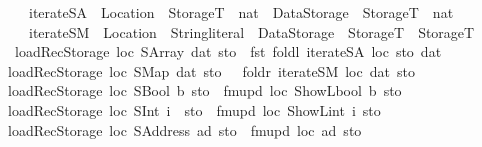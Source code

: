 \begin{isabellebody}
\ \ \ \ iterateSA\ {\isacharcolon}{\kern0pt}{\isacharcolon}{\kern0pt}\ {\isachardoublequoteopen}Location\ {\isasymRightarrow}\ StorageT\ {\isasymtimes}\ nat\ {\isasymRightarrow}\ Data\isactrlsub S\isactrlsub t\isactrlsub o\isactrlsub r\isactrlsub a\isactrlsub g\isactrlsub e\ {\isasymRightarrow}\ StorageT\ {\isasymtimes}\ nat{\isachardoublequoteclose}\ \isanewline
\ \ \ \ iterateSM\ {\isacharcolon}{\kern0pt}{\isacharcolon}{\kern0pt}\ {\isachardoublequoteopen}Location\ {\isasymRightarrow}\ String{\isachardot}{\kern0pt}literal\ {\isasymtimes}\ Data\isactrlsub S\isactrlsub t\isactrlsub o\isactrlsub r\isactrlsub a\isactrlsub g\isactrlsub e\ {\isasymRightarrow}\ StorageT\ {\isasymRightarrow}\ StorageT{\isachardoublequoteclose}\ \isanewline
\ \ {\isachardoublequoteopen}loadRec\isactrlsub S\isactrlsub t\isactrlsub o\isactrlsub r\isactrlsub a\isactrlsub g\isactrlsub e\ loc\ {\isacharparenleft}{\kern0pt}SArray\ dat{\isacharparenright}{\kern0pt}\ sto\ {\isacharequal}{\kern0pt}\ fst\ {\isacharparenleft}{\kern0pt}foldl\ {\isacharparenleft}{\kern0pt}iterateSA\ loc{\isacharparenright}{\kern0pt}\ {\isacharparenleft}{\kern0pt}sto{\isacharcomma}{\kern0pt}{}{\isacharparenright}{\kern0pt}\ dat{\isacharparenright}{\kern0pt}{\isachardoublequoteclose}\isanewline
{\isacharbar}{\kern0pt}\ {\isachardoublequoteopen}loadRec\isactrlsub S\isactrlsub t\isactrlsub o\isactrlsub r\isactrlsub a\isactrlsub g\isactrlsub e\ loc\ {\isacharparenleft}{\kern0pt}SMap\ dat{\isacharparenright}{\kern0pt}\ sto\ \ {\isacharequal}{\kern0pt}\ foldr\ {\isacharparenleft}{\kern0pt}iterateSM\ loc{\isacharparenright}{\kern0pt}\ dat\ sto{\isachardoublequoteclose}\isanewline
{\isacharbar}{\kern0pt}\ {\isachardoublequoteopen}loadRec\isactrlsub S\isactrlsub t\isactrlsub o\isactrlsub r\isactrlsub a\isactrlsub g\isactrlsub e\ loc\ {\isacharparenleft}{\kern0pt}SBool\ b{\isacharparenright}{\kern0pt}\ sto\ {\isacharequal}{\kern0pt}\ fmupd\ loc\ {\isacharparenleft}{\kern0pt}ShowL\isactrlsub b\isactrlsub o\isactrlsub o\isactrlsub l\ b{\isacharparenright}{\kern0pt}\ sto{\isachardoublequoteclose}\isanewline
{\isacharbar}{\kern0pt}\ {\isachardoublequoteopen}loadRec\isactrlsub S\isactrlsub t\isactrlsub o\isactrlsub r\isactrlsub a\isactrlsub g\isactrlsub e\ loc\ {\isacharparenleft}{\kern0pt}SInt\ i{\isacharparenright}{\kern0pt}\ \ sto\ {\isacharequal}{\kern0pt}\ fmupd\ loc\ {\isacharparenleft}{\kern0pt}ShowL\isactrlsub i\isactrlsub n\isactrlsub t\ i{\isacharparenright}{\kern0pt}\ sto{\isachardoublequoteclose}\isanewline
{\isacharbar}{\kern0pt}\ {\isachardoublequoteopen}loadRec\isactrlsub S\isactrlsub t\isactrlsub o\isactrlsub r\isactrlsub a\isactrlsub g\isactrlsub e\ loc\ {\isacharparenleft}{\kern0pt}SAddress\ ad{\isacharparenright}{\kern0pt}\ sto\ {\isacharequal}{\kern0pt}\ fmupd\ loc\ ad\ sto{\isachardoublequoteclose}\isanewline

\end{isabellebody}

